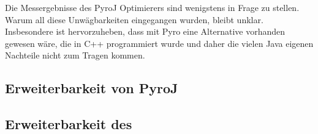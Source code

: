 Die Messergebnisse des PyroJ Optimierers sind wenigstens in Frage zu stellen. Warum all diese Unwägbarkeiten eingegangen wurden, bleibt unklar. Insbesondere ist hervorzuheben, dass mit Pyro eine Alternative vorhanden gewesen wäre, die in C++ programmiert wurde und daher die vielen Java eigenen Nachteile nicht zum Tragen kommen. 


\subsection{Erweiterbarkeit von PyroJ}




\subsection{Erweiterbarkeit des }